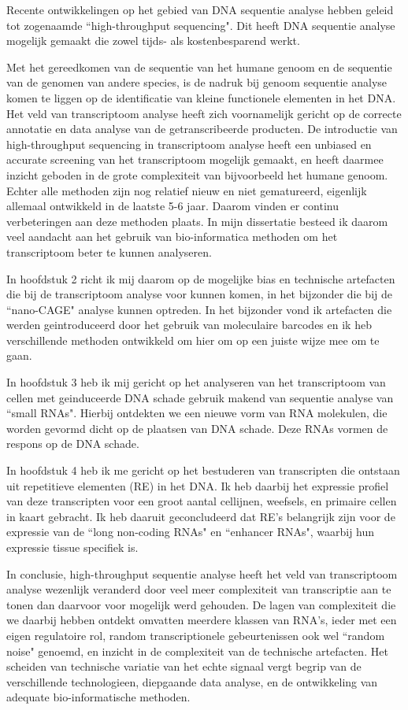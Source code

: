 Recente ontwikkelingen op het gebied van DNA sequentie analyse hebben geleid tot zogenaamde ``high-throughput sequencing". Dit heeft DNA sequentie analyse mogelijk gemaakt die zowel tijds- als kostenbesparend werkt.

Met het gereedkomen van de sequentie van het humane genoom en de sequentie van de genomen van andere species, is de nadruk bij genoom sequentie analyse komen te liggen op de identificatie van kleine functionele elementen in het DNA.  Het veld van transcriptoom analyse heeft zich voornamelijk gericht op de correcte annotatie en data analyse van de getranscribeerde producten. De introductie van high-throughput sequencing in transcriptoom analyse heeft een unbiased en accurate screening van het transcriptoom mogelijk gemaakt, en heeft daarmee inzicht geboden in de grote complexiteit van bijvoorbeeld het humane genoom. Echter alle methoden zijn nog relatief nieuw en niet gematureerd, eigenlijk allemaal ontwikkeld in de laatste 5-6 jaar. Daarom vinden er continu verbeteringen aan deze methoden plaats. In mijn dissertatie besteed ik daarom veel aandacht aan het gebruik van bio-informatica methoden om het transcriptoom beter te kunnen analyseren.

In hoofdstuk 2 richt ik mij daarom op de mogelijke bias en technische artefacten  die bij de transcriptoom analyse voor kunnen komen, in het bijzonder die bij de ``nano-CAGE" analyse kunnen optreden. In het bijzonder vond ik artefacten die werden geintroduceerd door het gebruik van moleculaire barcodes en ik heb verschillende methoden ontwikkeld om hier om op een juiste wijze mee om te gaan.

In hoofdstuk 3 heb ik mij gericht op het analyseren van het transcriptoom van cellen met geinduceerde DNA schade gebruik makend van sequentie analyse van ``small RNAs". Hierbij ontdekten we een nieuwe vorm van RNA molekulen, die worden gevormd dicht op de plaatsen van DNA schade. Deze RNAs vormen de respons op de DNA schade.

In hoofdstuk 4 heb ik me gericht op het bestuderen van transcripten die ontstaan uit repetitieve elementen (RE) in het DNA. Ik heb daarbij het expressie profiel van deze transcripten voor een groot aantal cellijnen, weefsels, en primaire cellen in kaart gebracht. Ik heb daaruit geconcludeerd dat RE's belangrijk zijn voor de expressie van de ``long non-coding RNAs" en ``enhancer RNAs", waarbij hun expressie tissue specifiek is.

In conclusie, high-throughput sequentie analyse heeft het veld van transcriptoom analyse wezenlijk veranderd door veel meer complexiteit van transcriptie aan te tonen dan daarvoor voor mogelijk werd gehouden. De lagen van complexiteit die we daarbij hebben ontdekt omvatten meerdere klassen van RNA's, ieder met een eigen regulatoire rol, random transcriptionele gebeurtenissen ook wel ``random noise" genoemd, en inzicht in de complexiteit van de technische artefacten. Het scheiden van technische variatie van het echte signaal vergt begrip van de verschillende technologieen, diepgaande data analyse, en de ontwikkeling van adequate bio-informatische methoden.
